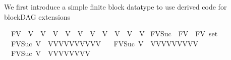 \begin{isabellebody}
\isadelimdocument
%
\endisadelimdocument
%
\isatagdocument
%
\isamarkuptrue%
%
\endisatagdocument
{\isafolddocument}%
%
\isadelimdocument
%
\endisadelimdocument
%
\begin{isamarkuptext}%
We first introduce a simple finite block datatype to use derived code for blockDAG extensions%
\end{isamarkuptext}\isamarkuptrue%
\isamarkupfalse%
\ \ FV\ {\isacharequal}{\kern0pt}\ V{}\ {\isacharbar}{\kern0pt}\ V{}\ {\isacharbar}{\kern0pt}\ V{}\ {\isacharbar}{\kern0pt}\ V{}\ {\isacharbar}{\kern0pt}\ V{}\ {\isacharbar}{\kern0pt}\ V{}\ {\isacharbar}{\kern0pt}\ V{}\ {\isacharbar}{\kern0pt}\ V{}\ {\isacharbar}{\kern0pt}\ V{}\ {\isacharbar}{\kern0pt}\ V{}{}\isanewline
\isanewline
{}\isamarkupfalse%
\ FV{\isacharunderscore}{\kern0pt}Suc\ {\isacharcolon}{\kern0pt}{\isacharcolon}{\kern0pt}{\isachardoublequoteopen}\ FV\ {\isasymRightarrow}\ FV\ set{\isachardoublequoteclose}\ \isanewline
\ \ \ \isanewline
\ \ {\isachardoublequoteopen}FV{\isacharunderscore}{\kern0pt}Suc\ V{}\ {\isacharequal}{\kern0pt}\ {\isacharbraceleft}{\kern0pt}V{}{\isacharcomma}{\kern0pt}V{}{\isacharcomma}{\kern0pt}V{}{\isacharcomma}{\kern0pt}V{}{\isacharcomma}{\kern0pt}V{}{\isacharcomma}{\kern0pt}V{}{\isacharcomma}{\kern0pt}V{}{\isacharcomma}{\kern0pt}V{}{\isacharcomma}{\kern0pt}V{}{\isacharcomma}{\kern0pt}V{}{}{\isacharbraceright}{\kern0pt}{\isachardoublequoteclose}\ {\isacharbar}{\kern0pt}\isanewline
\ \ {\isachardoublequoteopen}FV{\isacharunderscore}{\kern0pt}Suc\ V{}\ {\isacharequal}{\kern0pt}\ {\isacharbraceleft}{\kern0pt}V{}{\isacharcomma}{\kern0pt}V{}{\isacharcomma}{\kern0pt}V{}{\isacharcomma}{\kern0pt}V{}{\isacharcomma}{\kern0pt}V{}{\isacharcomma}{\kern0pt}V{}{\isacharcomma}{\kern0pt}V{}{\isacharcomma}{\kern0pt}V{}{\isacharcomma}{\kern0pt}V{}{}{\isacharbraceright}{\kern0pt}{\isachardoublequoteclose}\ {\isacharbar}{\kern0pt}\isanewline
\ \ {\isachardoublequoteopen}FV{\isacharunderscore}{\kern0pt}Suc\ V{}\ {\isacharequal}{\kern0pt}\ {\isacharbraceleft}{\kern0pt}V{}{\isacharcomma}{\kern0pt}V{}{\isacharcomma}{\kern0pt}V{}{\isacharcomma}{\kern0pt}V{}{\isacharcomma}{\kern0pt}V{}{\isacharcomma}{\kern0pt}V{}{\isacharcomma}{\kern0pt}V{}{\isacharcomma}{\kern0pt}V{}{}{\isacharbraceright}{\kern0pt}{\isachardoublequoteclose}\ {\isacharbar}{\kern0pt}\isanewline

\end{isabellebody}

